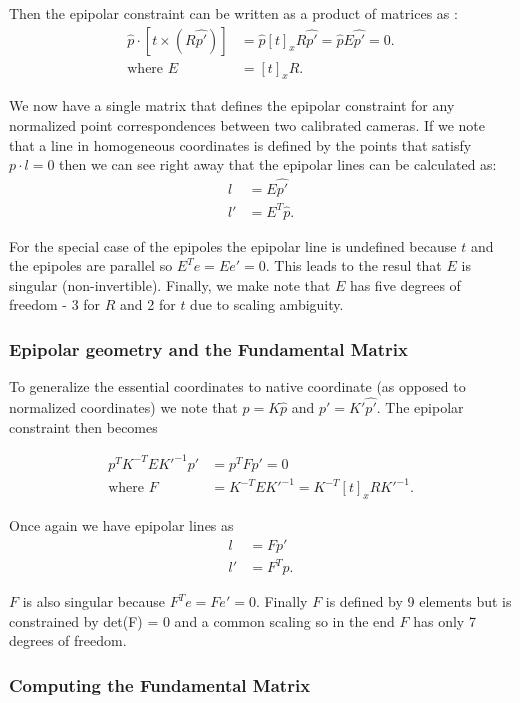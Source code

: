 \documentclass[twoside]{article}
\begin{document}
Then the epipolar constraint can be written as a product of matrices as :
\begin{align}
\hat{p} \cdot [t \times (R\hat{p'})] &= \hat{p} [t]_x R \hat{p'} = \hat{p}E\hat{p'} = 0. \\
\text{where } E &= [t]_xR.
\end{align}

We now have a single matrix that defines the epipolar constraint for any normalized point correspondences between two calibrated cameras. If we note that a line in homogeneous coordinates is defined by the points that satisfy $p \cdot l = 0$ then we can see right away that the epipolar lines can be calculated as:
\begin{align}
l &= E\hat{p'} \\
l' &= E^T\hat{p}.
\end{align}

For the special case of the epipoles the epipolar line is undefined because $t$ and the epipoles are parallel so $E^Te = Ee' = 0$. This leads to the resul that $E$ is singular (non-invertible). Finally, we make note that $E$ has five degrees of freedom - 3 for $R$ and 2 for $t$ due to scaling ambiguity.

\subsubsection{Epipolar geometry and the Fundamental Matrix \cite{FP}}

To generalize the essential coordinates to native coordinate (as opposed to normalized coordinates) we note that $p = K\hat{p}$ and $p' = K'\hat{p'}$. The epipolar constraint then becomes

\begin{align}
p^TK^{-T}EK'^{-1}p' &= p^T F p' = 0 \\
\text{where } F &= K^{-T}E K'^{-1} = K^{-T}[t]_x R K'^{-1}.
\end{align}

Once again we have epipolar lines as
\begin{align}
l &= Fp' \\
l' &= F^Tp.
\end{align}

$F$ is also singular because $F^Te = Fe' = 0$. Finally $F$ is defined by 9 elements but is constrained by det(F) = 0 and a common scaling so in the end $F$ has only 7 degrees of freedom.

\subsubsection{Computing the Fundamental Matrix}
\end{document}
